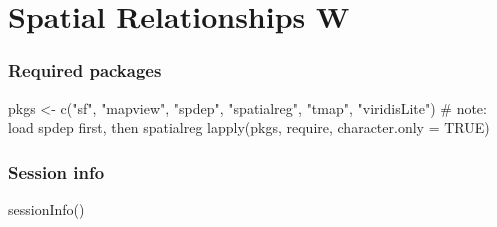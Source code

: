 \documentclass[
  letterpaper,
]{scrbook}
\newenvironment{Shaded}{\begin{snugshade}}{\end{snugshade}}
\newcommand{\AttributeTok}[1]{\textcolor[rgb]{0.40,0.45,0.13}{#1}}
\newcommand{\CommentTok}[1]{\textcolor[rgb]{0.37,0.37,0.37}{#1}}
\newcommand{\ConstantTok}[1]{\textcolor[rgb]{0.56,0.35,0.01}{#1}}
\newcommand{\FunctionTok}[1]{\textcolor[rgb]{0.28,0.35,0.67}{#1}}
\newcommand{\NormalTok}[1]{\textcolor[rgb]{0.00,0.23,0.31}{#1}}
\newcommand{\OtherTok}[1]{\textcolor[rgb]{0.00,0.23,0.31}{#1}}
\newcommand{\StringTok}[1]{\textcolor[rgb]{0.13,0.47,0.30}{#1}}
\begin{document}

\hypertarget{spatial-relationships-w}{%
\chapter{Spatial Relationships W}\label{spatial-relationships-w}}

\hypertarget{required-packages-2}{%
\subsection*{Required packages}\label{required-packages-2}}

\begin{Shaded}
\begin{Highlighting}[]
\NormalTok{pkgs }\OtherTok{\textless{}{-}} \FunctionTok{c}\NormalTok{(}\StringTok{"sf"}\NormalTok{, }\StringTok{"mapview"}\NormalTok{, }\StringTok{"spdep"}\NormalTok{, }\StringTok{"spatialreg"}\NormalTok{, }\StringTok{"tmap"}\NormalTok{, }\StringTok{"viridisLite"}\NormalTok{) }\CommentTok{\# note: load spdep first, then spatialreg}
\FunctionTok{lapply}\NormalTok{(pkgs, require, }\AttributeTok{character.only =} \ConstantTok{TRUE}\NormalTok{)}
\end{Highlighting}
\end{Shaded}

\hypertarget{session-info-2}{%
\subsection*{Session info}\label{session-info-2}}

\begin{Shaded}
\begin{Highlighting}[]
\FunctionTok{sessionInfo}\NormalTok{()}
\end{Highlighting}
\end{Shaded}
\end{document}
